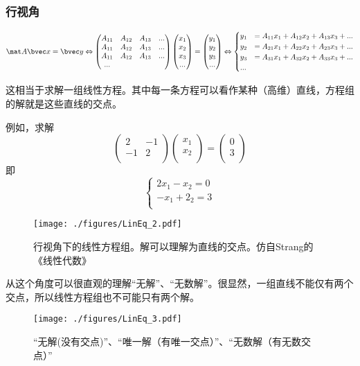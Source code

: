 \subsubsection{行视角}
$$
\mat A \bvec x=\bvec y \Leftrightarrow 
\begin{pmatrix}
A_{11}&A_{12}&A_{13}&...\\
A_{11}&A_{12}&A_{13}&...\\
A_{11}&A_{12}&A_{13}&...\\
...
\end{pmatrix}
\begin{pmatrix}
x_{1}\\
x_{2}\\
x_{3}\\
...\\
\end{pmatrix}
=
\begin{pmatrix}
y_{1}\\
y_{2}\\
y_{3}\\
...\\
\end{pmatrix}
\Leftrightarrow 
\begin{cases}
y_1&=A_{11}x_1+A_{12}x_2+A_{13}x_3+...\\
y_2&=A_{21}x_1+A_{22}x_2+A_{23}x_3+...\\
y_3&=A_{31}x_1+A_{32}x_2+A_{33}x_3+...\\
...&\\
\end{cases}
$$

这相当于求解一组线性方程。其中每一条方程可以看作某种（高维）直线，方程组的解就是这些直线的交点。

\begin{example}{}
例如，求解
$$
\begin{pmatrix}
2&-1\\
-1&2\\
\end{pmatrix}
\begin{pmatrix}
x_1\\
x_2\\
\end{pmatrix}
=
\begin{pmatrix}
0\\
3\\
\end{pmatrix}
$$
即
$$
\begin{cases}
2x_1-x_2=0\\
-x_1+2_2=3\\
\end{cases}
$$
\begin{figure}[ht]
\centering
\texttt{[image: ./figures/LinEq\_2.pdf]}
\caption{行视角下的线性方程组。解可以理解为直线的交点。仿自Strang的《线性代数》} \label{LinEq_fig2}
\end{figure}
\end{example}
从这个角度可以很直观的理解“无解”、“无数解”。很显然，一组直线不能仅有两个交点，所以线性方程组也不可能只有两个解。
\begin{figure}[ht]
\centering
\texttt{[image: ./figures/LinEq\_3.pdf]}
\caption{“无解(没有交点)”、“唯一解（有唯一交点）”、“无数解（有无数交点）”} \label{LinEq_fig3}
\end{figure}

